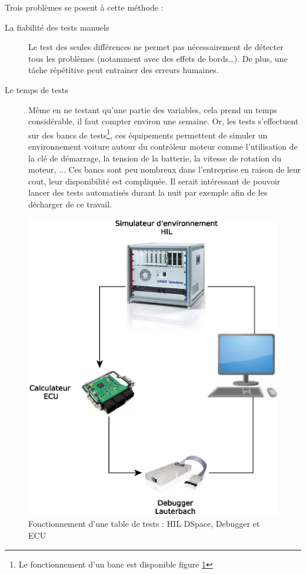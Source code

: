 	Trois problèmes se posent à cette méthode : 
	\begin{description}
		\item[La fiabilité des tests manuels] Le test des seules différences ne permet pas nécessairement de détecter tous les problèmes (notamment avec des effets de bords…). De plus, une tâche répétitive peut entrainer des erreurs humaines.
		\item[Le temps de tests] Même en ne testant qu'une partie des variables, cela prend un temps considérable, il faut compter environ une semaine.
			Or, les tests s'effectuent sur des bancs de tests\footnote{Le fonctionnement d'un banc est disponible figure
			\ref{fig:photoHil}}, ces équipements permettent de simuler un environnement voiture autour du contrôleur moteur comme
			l'utilisation de la clé de démarrage, la tension de la batterie, la vitesse de rotation du moteur, ... Ces bancs sont peu
			nombreux dans l'entreprise en raison de leur cout, leur disponibilité est compliquée. Il serait intéressant de pouvoir lancer
			des tests automatisés durant la nuit par exemple afin de les décharger de ce travail.
	\end{description}

	\begin{figure}[H]
		\centering
		\includegraphics[width=14cm]{contents/images/WB.eps}
		\caption{Fonctionnement d'une table de tests : HIL DSpace, Debugger et ECU}
		\label{fig:photoHil}
	\end{figure}

